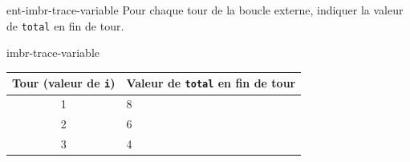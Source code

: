 \begin{question}{ent-imbr-trace-variable}
    Pour chaque tour de la boucle externe, indiquer la valeur de \texttt{total} en fin de tour.
    
\end{question}

\begin{UPSTIcorrectionP}{imbr-trace-variable}
    \begin{center}
    \begin{tabular}{|c|p{4cm}|}
        \hline
        \textbf{Tour (valeur de \texttt{i})} & \textbf{Valeur de \texttt{total} en fin de tour} \\
        \hline
        1 & 8 \\[0.3cm]
        \hline
        2 & 6 \\[0.3cm]
        \hline
        3 & 4 \\[0.3cm]
        \hline
    \end{tabular}
    \end{center}
\end{UPSTIcorrectionP}
